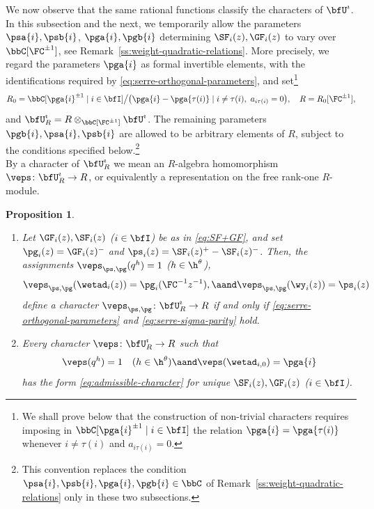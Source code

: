 \documentclass[reqno]{amsart}
\numberwithin{equation}{section}
\newtheorem*{proposition}{Proposition}
\begin{document}
We now observe that the same rational functions classify the characters of $\bfU^\imath$.
In this subsection and the next, we temporarily allow the parameters $\psa{i}, \psb{i}$, $\pga{i}, \pgb{i}$ determining $\SF_i(z), \GF_i(z)$ to vary over $\bbC[\FC^{\pm1}]$, see Remark~\ref{ss:weight-quadratic-relations}. More precisely, we regard the
parameters $\pga{i}$ as formal invertible elements, with
the identifications required by \eqref{eq:serre-orthogonal-parameters},
and set\footnote{We shall prove below that the construction of non-trivial characters requires imposing in $\bbC[\pga{i}^{\pm1}\mid i\in\bfI]$ the relation $\pga{i}=\pga{\tau(i)}$ whenever $i\neq\tau(i)$ and $a_{i\tau(i)}=0$.
}
\begin{equation}\label{eq:parameter-ring}
R_0=\bbC[\pga{i}^{\pm1}\mid i\in\bfI]
\big/\bigl(\pga{i}-\pga{\tau(i)}\mid
i\neq\tau(i),\ a_{i\tau(i)}=0\bigr),
\quad
R=R_0[\FC^{\pm1}],
\end{equation}
and  $\bfU^\imath_R=R\otimes_{\bbC[\FC^{\pm1}]}\bfU^\imath$.
The remaining parameters $\pgb{i},\psa{i},\psb{i}$ are allowed to be arbitrary elements
of $R$, subject to the conditions specified below.\footnote{This convention
replaces the condition $\psa{i}, \psb{i}, \pga{i}, \pgb{i}\in\bbC$ of
Remark~\ref{ss:weight-quadratic-relations} only in these two subsections.}\\

By a character of $\bfU^\imath_R$ we mean an $R$-algebra homomorphism
$\veps\colon\bfU^\imath_R\to R$, or equivalently a representation
on the free rank-one $R$-module.

\begin{proposition}\label{prop:one-dimensional}
\hfill
\begin{enumerate}[leftmargin=2em]\itemsep0.25cm
\item 
Let $\GF_i(z),\SF_i(z)$ ($i\in\bfI$) be as in \eqref{eq:SF+GF}, and set
$\pg_i(z)=\GF_i(z)^-$ and $\ps_i(z)=\SF_i(z)^+-\SF_i(z)^-$.
Then, the assignments
$\veps_{\ps,\pg}(q^h)=1$ ($h\in\h^{\theta}$),
\begin{equation}\label{eq:admissible-character}
\veps_{\ps,\pg}(\wetad_i(z))=\pg_i(\FC^{-1}z^{-1}),
\aand
\veps_{\ps,\pg}(\wy_i(z))=\ps_i(z)
\end{equation}
define a character
$\veps_{\ps,\pg}\colon\bfU^\imath_R\to R$ if and only if
\eqref{eq:serre-orthogonal-parameters} and
\eqref{eq:serre-sigma-parity} hold.
\item 
Every character $\veps\colon\bfU^\imath_R\to R$ such that
\begin{equation}\label{eq:character-normalization}
\veps(q^h)=1\quad (h\in\h^{\theta}) \aand \veps(\wetad_{i,0})=\pga{i}
\end{equation}
has the form \eqref{eq:admissible-character} for unique $\SF_i(z), \GF_i(z)$ ($i\in\bfI$).
\end{enumerate}
\end{proposition}
\end{document}

